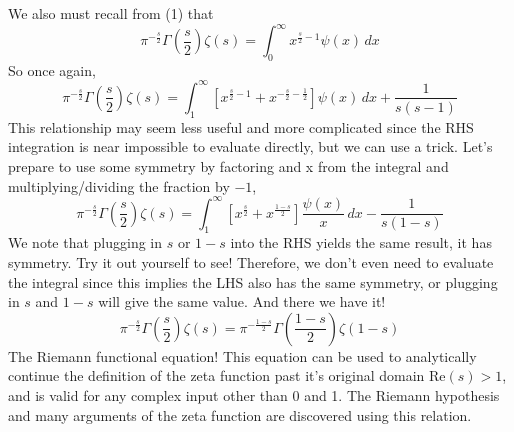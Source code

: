 \documentclass{article}
\begin{document}
We also must recall from (1) that
\begin{equation*}
    \pi^{-\frac{s}{2}}\Gamma\left(\frac{s}{2}\right)\zeta(s)= \int_{0}^{\infty}  x^{\frac{s}{2}-1}\psi(x)\,dx
\end{equation*}
So once again,
\begin{equation*}
     \pi^{-\frac{s}{2}}\Gamma\left(\frac{s}{2}\right)\zeta(s)=\int_{1}^{\infty}\left[x^{\frac{s}{2}-1}+x^{-\frac{s}{2}-\frac{1}{2}}\right]\psi(x)\,dx+\frac{1}{s(s-1)}
\end{equation*}   
This relationship may seem less useful and more complicated since the RHS integration is near impossible to evaluate directly, but we can use a trick. Let's prepare to use some symmetry by factoring and x from the integral and multiplying/dividing the fraction by $-1$,
\begin{equation*}
         \pi^{-\frac{s}{2}}\Gamma\left(\frac{s}{2}\right)\zeta(s)=\int_{1}^{\infty}\left[x^{\frac{s}{2}}+x^{\frac{1-s}{2}}\right]\frac{\psi(x)}{x}\,dx-\frac{1}{s(1-s)}
\end{equation*}
We note that plugging in $s$ or $1-s$ into the RHS yields the same result, it has symmetry. Try it out yourself to see! Therefore, we don't even need to evaluate the integral since this implies the LHS also has the same symmetry, or plugging in $s$ and $1-s$ will give the same value. And there we have it!
\begin{equation*}
 \pi^{-\frac{s}{2}}\Gamma\left(\frac{s}{2}\right)\zeta(s)=\pi^{-\frac{1-s}{2}}\Gamma\left(\frac{1-s}{2}\right)\zeta(1-s)
\end{equation*}
The Riemann functional equation! This equation can be used to analytically continue the definition of the zeta function past it's original domain $\text{Re}(s)>1$, and is valid for any complex input other than 0 and 1. The Riemann hypothesis and many arguments of the zeta function are discovered using this relation.
\end{document}
